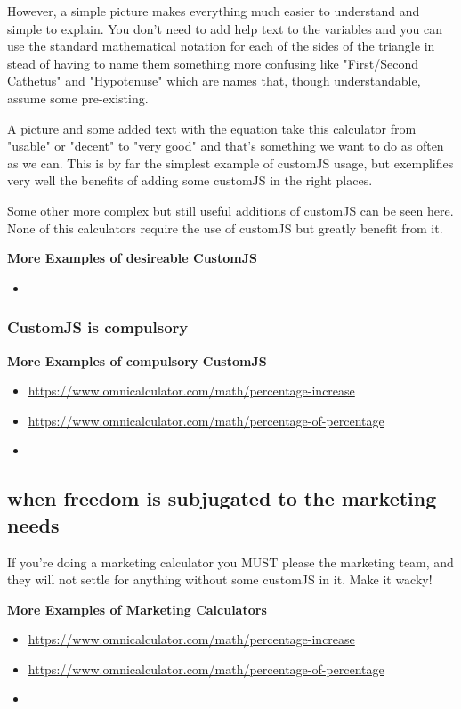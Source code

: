 However, a simple picture makes everything much easier to understand and simple to explain. You don't need to add help text to the variables and you can use the standard mathematical notation for each of the sides of the triangle in stead of having to name them something more confusing like "First/Second Cathetus" and "Hypotenuse" which are names that, though understandable, assume some pre-existing. 

A picture and some added text with the equation take this calculator from "usable" or "decent" to "very good" and that's something we want to do as often as we can. This is by far the simplest example of customJS usage, but exemplifies very well the benefits of adding some customJS in the right places. 

Some other more complex but still useful additions of customJS can be seen here. None of this calculators require the use of customJS but greatly benefit from it.

\textbf{More Examples of desireable CustomJS}
\begin{itemize}
    \item \href{}{}
\end{itemize}

\subsubsection{CustomJS is compulsory}
\label{subsub:compulsory}

\textbf{More Examples of compulsory CustomJS}
\begin{itemize}
    \item \href{Percentage Increase Calculator}{https://www.omnicalculator.com/math/percentage-increase}
    \item \href{Percentage of a Percentage Calculator}{https://www.omnicalculator.com/math/percentage-of-percentage}
    \item \href{Calculator}{}
\end{itemize}
\subsection{when freedom is subjugated to the marketing needs}
\label{sub:marketing}
If you're doing a marketing calculator you MUST please the marketing team, and they will not settle for anything without some customJS in it. Make it wacky!


\textbf{More Examples of Marketing Calculators}
\begin{itemize}
    \item \href{Percentage Increase Calculator}{https://www.omnicalculator.com/math/percentage-increase}
    \item \href{Percentage of a Percentage Calculator}{https://www.omnicalculator.com/math/percentage-of-percentage}
    \item \href{Calculator}{}
\end{itemize}

    
